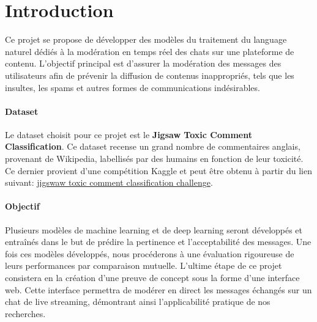 
\chapter{Introduction}

Ce projet se propose de développer des modèles du traitement du language naturel dédiés à la modération en temps réel des chats sur une plateforme de contenu. L'objectif principal est d'assurer la modération des messages des utilisateurs afin de prévenir la diffusion de contenus inappropriés, tels que les insultes, les spams et autres formes de communications indésirables.
\subsubsection*{Dataset} 
Le dataset choisit pour ce projet est le \textbf{Jigsaw Toxic Comment Classification}.
Ce dataset recense un grand nombre de commentaires anglais, provenant de Wikipedia, labellisés par des humains en fonction de leur toxicité.
Ce dernier provient d'une compétition Kaggle et peut être obtenu à partir du lien suivant: \href{https://www.kaggle.com/competitions/jigsaw-toxic-comment-classification-challenge/data}{jigswaw toxic comment classification challenge}.

\subsubsection*{Objectif}
Plusieurs modèles de machine learning et de deep learning seront développés et entraînés dans le but de prédire la pertinence et l'acceptabilité des messages.
Une fois ces modèles développés, nous procéderons à une évaluation rigoureuse de leurs performances par comparaison mutuelle. L'ultime étape de ce projet consistera en la création d'une preuve de concept sous la forme d'une interface web. Cette interface permettra de modérer en direct les messages échangés sur un chat de live streaming, démontrant ainsi l'applicabilité pratique de nos recherches.
